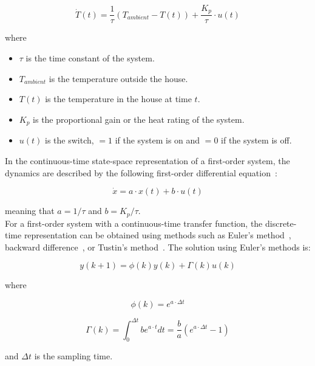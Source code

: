\begin{equation}
    \dot{T}(t) = \frac{1}{\tau} \left( T_{ambient} - T(t) \right) + \frac{K_{p}}{\tau} \cdot u(t)
\end{equation}

where

\begin{itemize}
    \item $\tau$ is the time constant of the system.

    \item $T_{ambient}$ is the temperature outside the house.

    \item $T(t)$ is the temperature in the house at time $t$.

    \item $K_{p}$ is the proportional gain or the heat rating of the system.

    \item $u(t)$ is the switch, $= 1$ if the system is on and $= 0$ if the system is off. \\
\end{itemize}

In the continuous-time state-space representation of a first-order system, the dynamics are described by the following first-order differential equation~\cite{ayomoh2012}:

\begin{equation}
    \dot{x} = a \cdot x(t) + b \cdot u(t)
\end{equation}

meaning that $a = 1/\tau$ and $b = K_{p}/\tau$. \\

For a first-order system with a continuous-time transfer function, the discrete-time representation can be obtained using methods such as Euler's method~\cite{griffiths2010}, backward difference~\cite{suleiman2011}, or Tustin's method~\cite{phillips1985}. The solution using Euler's methods is:

\begin{equation}
    y(k + 1) = \phi(k) y(k) + \Gamma(k) u(k)
    \label{eq:yk1}
\end{equation}

where

\begin{equation}
    \phi(k) = e^{a \cdot \Delta t}
    \label{eq:phi}
\end{equation}

\begin{equation}
    \Gamma(k) = \int_{0}^{\Delta t}{b} e^{a \cdot t} dt = \frac{b}{a} \left( e^{a \cdot \Delta t} - 1\right)
    \label{eq:gamma}
\end{equation}

and $\Delta t$ is the sampling time.

